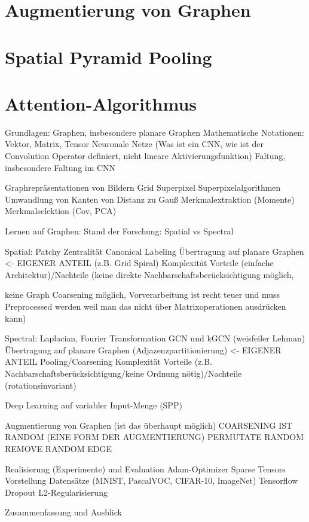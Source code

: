 \section{Augmentierung von Graphen}
\section{Spatial Pyramid Pooling}
\section{Attention-Algorithmus}

Grundlagen:
Graphen, insbesondere planare Graphen
Mathematische Notationen: Vektor, Matrix, Tensor
Neuronale Netze (Was ist ein CNN, wie ist der Convolution Operator definiert, nicht lineare Aktivierungsfunktion)
Faltung, insbesondere Faltung im CNN

Graphrepräsentationen von Bildern
Grid
Superpixel
Superpixelalgorithmen
Umwandlung von Kanten von Distanz zu Gauß
Merkmalextraktion (Momente)
Merkmalselektion (Cov, PCA)

Lernen auf Graphen:
Stand der Forschung: Spatial vs Spectral

Spatial:
Patchy
Zentralität
Canonical Labeling
Übertragung auf planare Graphen <- EIGENER ANTEIL (z.B. Grid Spiral)
Komplexität
Vorteile (einfache Architektur)/Nachteile (keine direkte Nachbarschaftsberücksichtigung möglich,

keine Graph Coarsening möglich, Vorverarbeitung ist recht teuer und muss Preprocessed werden weil man das nicht über Matrixoperationen ausdrücken kann)

Spectral:
Laplacian, Fourier Transformation
GCN und kGCN (weisfeiler Lehman)
Übertragung auf planare Graphen (Adjazenzpartitionierung) <- EIGENER ANTEIL
Pooling/Coarsening
Komplexität
Vorteile (z.B. Nachbarschaftsberücksichtigung/keine Ordnung nötig)/Nachteile (rotationsinvariant)

Deep Learning auf variabler Input-Menge (SPP)

Augmentierung von Graphen (ist das überhaupt möglich)
COARSENING IST RANDOM (EINE FORM DER AUGMENTIERUNG)
PERMUTATE RANDOM
REMOVE RANDOM EDGE

Realisierung (Experimente) und Evaluation
Adam-Optimizer
Sparse Tensors
Vorstellung Datensätze (MNIST, PascalVOC, CIFAR-10, ImageNet)
Tensorflow
Dropout L2-Regularisierung

Zusammenfassung und Ausblick
